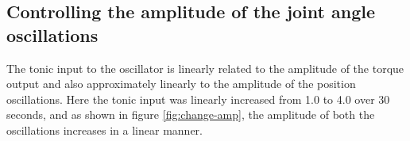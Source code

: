 \documentclass[12pt,twoside]{article}
\theoremstyle{plain}
\theoremstyle{definition}
\theoremstyle{remark}
\begin{document}
\subsection{Controlling the amplitude of the joint angle oscillations}
The tonic input to the oscillator is linearly related to the amplitude of the torque output and also approximately linearly to the amplitude of the position oscillations. Here the tonic input was linearly increased from 1.0 to 4.0 over 30 seconds, and as shown in figure \ref{fig:change-amp}, the amplitude of both the oscillations increases in a linear manner.

\begin{figure}[htbp]
\centering     %
{}

\end{figure}
\end{document}

